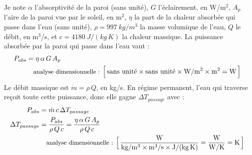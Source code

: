 \begin{demonstration}
Je note $\alpha$ l'absorptivité de la paroi (sans unité), $G$ l'éclairement, en W/m$^2$, $A_p$ l'aire de la paroi vue par le soleil, en m$^2$, $\eta$ la part de la chaleur absorbée qui passe dans l'eau (sans unité), $\rho = \qty{997}{kg/m^3}$ la masse volumique de l'eau, $Q$ le débit, en m$^3$/s, et $c = \qty{4180}{J/(kg\,K)}$ la chaleur massique. La puissance absorbée par la paroi qui passe dans l'eau vaut :
\begin{align*}
P_{abs} &= \eta\,\alpha\,G\,A_p\\
\dimline{\text{sans unité}\times\text{sans unité}\times\unit{W/m^2}\times\unit{m^2}=\unit{W}}
\end{align*}
Le débit massique est $\dot m = \rho\,Q$, en kg/s. En régime permanent, l'eau qui traverse reçoit toute cette puissance, donc elle gagne $\Delta T_{passage}$ avec :
\begin{align*}
P_{abs} &= \dot m\,c\,\Delta T_{passage}\\
\Delta T_{passage} &= \frac{P_{abs}}{\rho\,Q\,c} = \frac{\eta\,\alpha\,G\,A_p}{\rho\,Q\,c}\\
\dimline{\dfrac{\unit{W}}{\unit{kg/m^3}\times\unit{m^3/s}\times\unit{J/(kg\,K)}}=\dfrac{\unit{W}}{\unit{W/K}}=\unit{K}}
\end{align*}
\end{demonstration}

